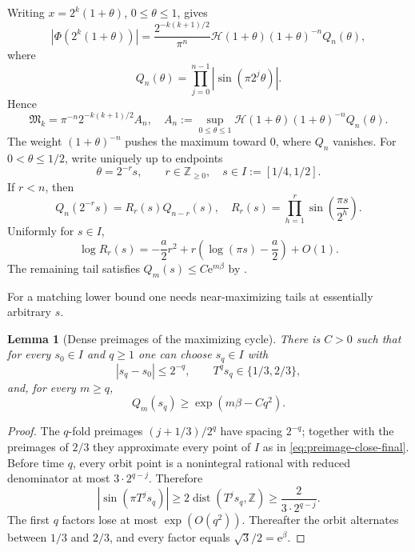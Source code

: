\documentclass[11pt,oneside]{article}
\newtheorem{lemma}[lemma]{Lemma}
\theoremstyle{definition}
\theoremstyle{remark}
\newcommand{\Z}{\mathbb Z}
\newcommand{\e}{\mathrm e}
\newcommand{\Phiup}{\Phi}
\begin{document}
Writing $x=2^k(1+\theta)$, $0\le\theta\le1$, gives
\begin{equation}
 |\Phiup(2^k(1+\theta))|
 =\frac{2^{-k(k+1)/2}}{\pi^n}
 \mathcal H(1+\theta)(1+\theta)^{-n}Q_n(\theta),
 \label{eq:annular-exact-final}
\end{equation}
where
\[
 Q_n(\theta)=\prod_{j=0}^{n-1}|\sin(\pi2^j\theta)|.
\]
Hence
\begin{equation}
 \mathfrak M_k=\pi^{-n}2^{-k(k+1)/2}A_n,
 \quad
 A_n:=\sup_{0\le\theta\le1}
 \mathcal H(1+\theta)(1+\theta)^{-n}Q_n(\theta).
 \label{eq:An-final}
\end{equation}
The weight $(1+\theta)^{-n}$ pushes the maximum toward $0$, where $Q_n$ vanishes.
For $0<\theta\le1/2$, write uniquely up to endpoints
\begin{equation}
 \theta=2^{-r}s,
 \qquad r\in\Z_{\ge0},\quad s\in I:=[1/4,1/2].
 \label{eq:transition-final}
\end{equation}
If $r<n$, then
\begin{equation}
 Q_n(2^{-r}s)=R_r(s)Q_{n-r}(s),
 \quad
 R_r(s)=\prod_{h=1}^{r}\sin\!\left(\frac{\pi s}{2^h}\right).
 \label{eq:transition-product-final}
\end{equation}
Uniformly for $s\in I$,
\begin{equation}
 \log R_r(s)
 =-\frac a2r^2+r\left(\log(\pi s)-\frac a2\right)+O(1).
 \label{eq:small-block-final}
\end{equation}
The remaining tail satisfies $Q_m(s)\le C\e^{m\beta}$ by
.

For a matching lower bound one needs near-maximizing tails at essentially arbitrary $s$.

\begin{lemma}[Dense preimages of the maximizing cycle]
\label{lem:dense-preimages-final}
There is $C>0$ such that for every $s_0\in I$ and $q\ge1$ one can choose $s_q\in I$ with
\begin{equation}
 |s_q-s_0|\le2^{-q},
 \qquad T^qs_q\in\{1/3,2/3\},
 \label{eq:preimage-close-final}
\end{equation}
and, for every $m\ge q$,
\begin{equation}
 Q_m(s_q)\ge\exp(m\beta-Cq^2).
 \label{eq:preimage-lower-final}
\end{equation}
\end{lemma}

\begin{proof}
The $q$-fold preimages $(j+1/3)/2^q$ have spacing $2^{-q}$; together with the preimages of
$2/3$ they approximate every point of $I$ as in \eqref{eq:preimage-close-final}.  Before
time $q$, every orbit point is a nonintegral rational with reduced denominator at most
$3\cdot2^{q-j}$.  Therefore
\[
 |\sin(\pi T^js_q)|\ge2\operatorname{dist}(T^js_q,\Z)
 \ge\frac{2}{3\cdot2^{q-j}}.
\]
The first $q$ factors lose at most $\exp(O(q^2))$.  Thereafter the orbit alternates between
$1/3$ and $2/3$, and every factor equals $\sqrt3/2=\e^\beta$.
\end{proof}
\end{document}
